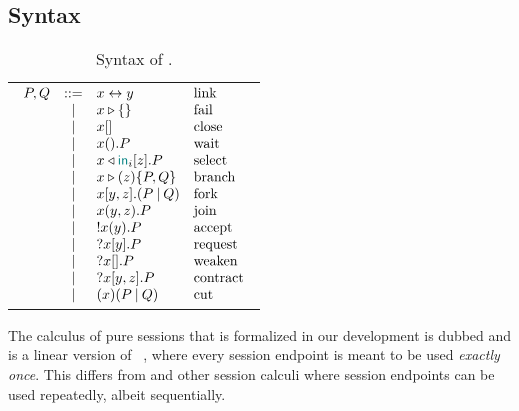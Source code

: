 \section{\Calculus}
\label{sec:calculus}

\subsection{Syntax}
\label{sec:syntax}

\begin{table}
    \caption{Syntax of \Calculus.}\label{tab:syntax}
    \begin{tabular}{c}
        \begin{math}
            \displaystyle
            \begin{array}[t]{rcll}
                P, Q & ::= & \Link\x\y            & \text{link} \\
                    & | & \Fail\x                 & \text{fail} \\
                    & | & \Close\x                & \text{close} \\
                    & | & \Wait\x.P               & \text{wait} \\
                    & | & \Select\x{\InTag_i}\z.P & \text{select} \\
                    & | & \Case\x\z{P}{Q}         & \text{branch} \\
                    & | & \Fork\x\y\z{P}{Q}       & \text{fork} \\
                    & | & \Join\x\y\z.P           & \text{join} \\
                    & | & \Server\x\y.P           & \text{accept} \\
                    & | & \Client\x\y.P           & \text{request} \\
                    & | & \Weaken\x.P             & \text{weaken} \\
                    & | & \Contract\x\y\z.P       & \text{contract} \\
                    & | & \Cut\x{P}{Q}            & \text{cut} \\
            \end{array}
        \end{math}
    \end{tabular}
\end{table}

The calculus of pure sessions that is formalized in our development is dubbed
\Calculus and is a linear version of \CP~\citep{Wadler14,GayVasconcelos25},
where every session endpoint is meant to be used \emph{exactly once}. This
differs from \CP and other session calculi where session endpoints can be used
repeatedly, albeit sequentially.

